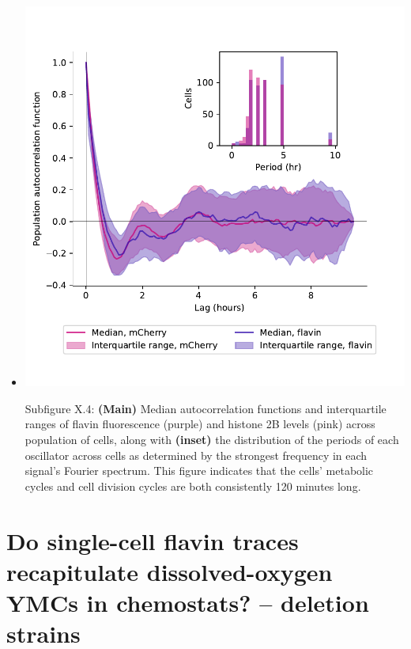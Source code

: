 \begin{itemize}
\begin{itemize}
\item \begin{center}
\includegraphics[width=.9\linewidth]{htb2mCherry_613_plots_12.pdf}
\end{center} Subfigure X.4: \textbf{(Main)} Median autocorrelation functions and interquartile ranges of flavin fluorescence (purple) and histone 2B levels (pink) across population of cells, along with \textbf{(inset)} the distribution of the periods of each oscillator across cells as determined by the strongest frequency in each signal's Fourier spectrum.  This figure indicates that the cells' metabolic cycles and cell division cycles are both consistently 120 minutes long.
\end{itemize}

\end{itemize}

\section{Do single-cell flavin traces recapitulate dissolved-oxygen YMCs in chemostats? -- deletion strains}
\label{sec:biology-deletions}

